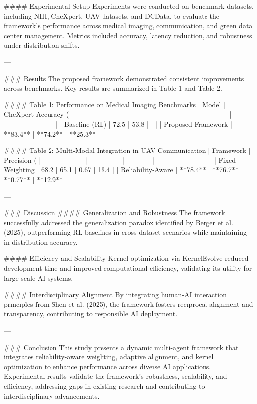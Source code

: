 #### Experimental Setup
Experiments were conducted on benchmark datasets, including NIH, CheXpert, UAV datasets, and DCData, to evaluate the framework's performance across medical imaging, communication, and green data center management. Metrics included accuracy, latency reduction, and robustness under distribution shifts.

---

### Results
The proposed framework demonstrated consistent improvements across benchmarks. Key results are summarized in Table 1 and Table 2.

#### Table 1: Performance on Medical Imaging Benchmarks  
| Model              | CheXpert Accuracy (%
|--------------------|-----------------------|------------------------|-----------------------|
| Baseline (RL)      | 72.5                 | 53.8                  | -                     |
| Proposed Framework | **83.4**             | **74.2**              | **25.3**             |

#### Table 2: Multi-Modal Integration in UAV Communication  
| Framework          | Precision (%
|--------------------|---------------|------------|----------|--------------|
| Fixed Weighting    | 68.2          | 65.1       | 0.67     | 18.4         |
| Reliability-Aware  | **78.4**      | **76.7**   | **0.77** | **12.9**     |

---

### Discussion
#### Generalization and Robustness
The framework successfully addressed the generalization paradox identified by Berger et al. (2025), outperforming RL baselines in cross-dataset scenarios while maintaining in-distribution accuracy.

#### Efficiency and Scalability
Kernel optimization via KernelEvolve reduced development time and improved computational efficiency, validating its utility for large-scale AI systems.

#### Interdisciplinary Alignment
By integrating human-AI interaction principles from Shen et al. (2025), the framework fosters reciprocal alignment and transparency, contributing to responsible AI deployment.

---

### Conclusion
This study presents a dynamic multi-agent framework that integrates reliability-aware weighting, adaptive alignment, and kernel optimization to enhance performance across diverse AI applications. Experimental results validate the framework's robustness, scalability, and efficiency, addressing gaps in existing research and contributing to interdisciplinary advancements.

